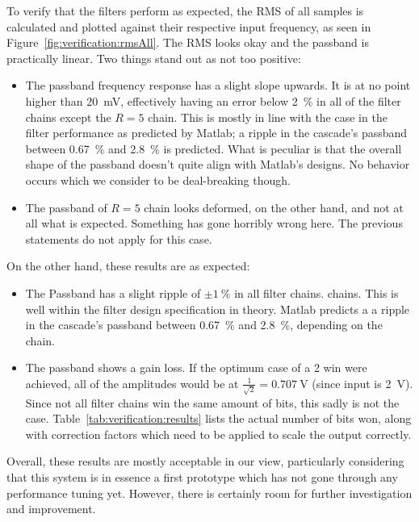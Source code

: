 To verify  that the  filters perform as  expected, the RMS  of all  samples is
calculated and  plotted against their  respective input frequency, as  seen in
Figure~\ref{fig:verification:rmsAll}.  The RMS looks  okay and the passband is
practically linear. Two things stand out as not too positive:
\begin{itemize}\tightlist
    \item 
        The passband frequency  response has a slight slope  upwards. It is at
        no  point  higher  than  \SI{20}{\mV},  effectively  having  an  error
        below  \SI{2}{\percent}  in  all  of  the  filter  chains  except  the
        $R=5$  chain.  
        This is  mostly in  line with  the case in  the filter  performance as
        predicted  by  Matlab; a  ripple  in  the cascade's  passband  between
        \SI{0.67}{\percent} and \SI{2.8}{\percent} is predicted.
        What is  peculiar is that  the overall  shape of the  passband doesn't
        quite  align  with  Matlab's  designs. No  behavior  occurs  which  we
        consider to be deal-breaking though.
    \item 
        The passband of $R=5$ chain looks deformed, on the other hand, and not
        at all what  is expected. Something has gone  horribly wrong here. The
        previous statements do not apply for this case.
\end{itemize}
On the other hand, these results are as expected:
\begin{itemize}
    \item 
        The  Passband has  a  slight ripple  of  $\pm\SI{1}{\percent}$ in  all
        filter  chains.   chains. This  is  well  within   the  filter  design
        specification in theory.  Matlab predicts  a a ripple in the cascade's
        passband between \SI{0.67}{\percent} and \SI{2.8}{\percent}, depending
        on the chain.
    \item 
        The  passband   shows  a   gain  loss. If  the   optimum  case   of  a
        \SI{2}{\bit}  win   were  achieved,   all  of  the   amplitudes  would
        be   at  $\frac{1}{\sqrt{2}}   =  \SI{0.707}{\V}$   (since  input   is
        \SI{2}{V_{}}).    Since   not   all   filter   chains   win
        the   same   amount  of   bits,   this   sadly   is  not   the   case.
        Table~\ref{tab:verification:results} lists  the actual number  of bits
        won, along with  correction factors which need to be  applied to scale
        the output correctly.
\end{itemize}
Overall,  these  results  are  mostly acceptable  in  our  view,  particularly
considering that  this system is  in essence a  first prototype which  has not
gone through any performance tuning  yet. However, there is certainly room for
further investigation and improvement.

